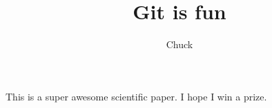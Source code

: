 \documentclass[10pt]{article}
\author{Chuck}
\title{Git is fun}
\begin{document}
    \maketitle

    This is a super awesome scientific paper.
    I hope I win a prize.
\end{document}
